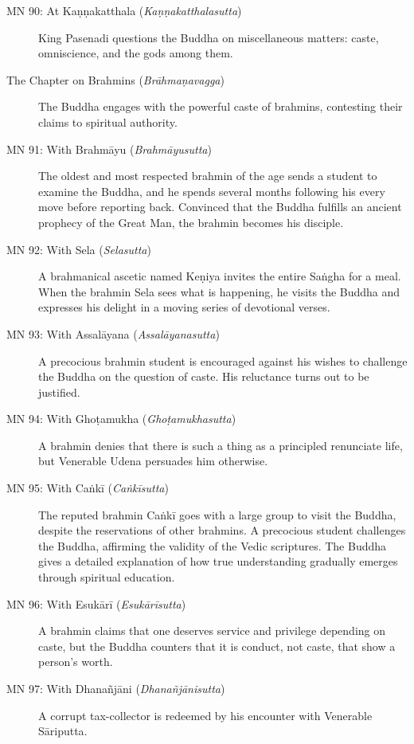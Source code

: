 \documentclass[12pt,openany]{book}%
\begin{document}
\begin{description}
\item[MN 90: At \textsanskrit{Kaṇṇakatthala} (\textit{\textsanskrit{Kaṇṇakatthalasutta}})] King Pasenadi questions the Buddha on miscellaneous matters: caste, omniscience, and the gods among them.%
\item[The Chapter on Brahmins (\textit{\textsanskrit{Brāhmaṇavagga}})] The Buddha engages with the powerful caste of brahmins, contesting their claims to spiritual authority.%
\item[MN 91: With \textsanskrit{Brahmāyu} (\textit{\textsanskrit{Brahmāyusutta}})] The oldest and most respected brahmin of the age sends a student to examine the Buddha, and he spends several months following his every move before reporting back. Convinced that the Buddha fulfills an ancient prophecy of the Great Man, the brahmin becomes his disciple.%
\item[MN 92: With Sela (\textit{\textsanskrit{Selasutta}})] A brahmanical ascetic named \textsanskrit{Keṇiya} invites the entire \textsanskrit{Saṅgha} for a meal. When the brahmin Sela sees what is happening, he visits the Buddha and expresses his delight in a moving series of devotional verses.%
\item[MN 93: With \textsanskrit{Assalāyana} (\textit{\textsanskrit{Assalāyanasutta}})] A precocious brahmin student is encouraged against his wishes to challenge the Buddha on the question of caste. His reluctance turns out to be justified.%
\item[MN 94: With \textsanskrit{Ghoṭamukha} (\textit{\textsanskrit{Ghoṭamukhasutta}})] A brahmin denies that there is such a thing as a principled renunciate life, but Venerable Udena persuades him otherwise.%
\item[MN 95: With \textsanskrit{Caṅkī} (\textit{\textsanskrit{Caṅkīsutta}})] The reputed brahmin \textsanskrit{Caṅkī} goes with a large group to visit the Buddha, despite the reservations of other brahmins. A precocious student challenges the Buddha, affirming the validity of the Vedic scriptures. The Buddha gives a detailed explanation of how true understanding gradually emerges through spiritual education.%
\item[MN 96: With \textsanskrit{Esukārī} (\textit{\textsanskrit{Esukārīsutta}})] A brahmin claims that one deserves service and privilege depending on caste, but the Buddha counters that it is conduct, not caste, that show a person’s worth.%
\item[MN 97: With \textsanskrit{Dhanañjāni} (\textit{\textsanskrit{Dhanañjānisutta}})] A corrupt tax-collector is redeemed by his encounter with Venerable \textsanskrit{Sāriputta}.%

\end{description}
\end{document}
